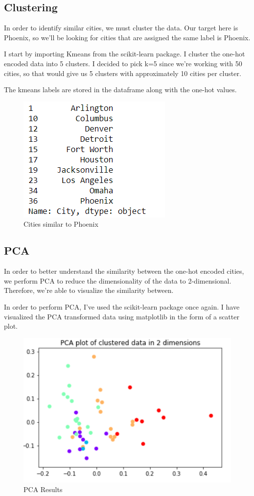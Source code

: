 \documentclass[12pt, a4paper]{report}
\begin{document}
\subsection*{Clustering}
In order to identify similar cities, we must cluster the data. Our target here is Phoenix, so we'll be looking for cities that are assigned the same label is Phoenix. 

I start by importing Kmeans from the scikit-learn package. I cluster the one-hot encoded data into 5 clusters. I decided to pick k=5 since we're working with 50 cities, so that would give us 5 clusters with approximately 10 cities per cluster. 

The kmeans labels are stored in the dataframe along with the one-hot values. 

\begin{figure}[H]
	\includegraphics[]{cities}
	\caption{Cities similar to Phoenix}
\end{figure}

\subsection*{PCA}
In order to better understand the similarity between the one-hot encoded cities, we perform PCA to reduce the dimensionality of the data to 2-dimensional. Therefore, we're able to visualize the similarity between. 

In order to perform PCA, I've used the scikit-learn package once again. I have visualized the PCA transformed data using matplotlib in the form of a scatter plot.

\begin{figure}[H]
	\includegraphics[]{pca}
	\caption{PCA Results}
\end{figure}
\end{document}
